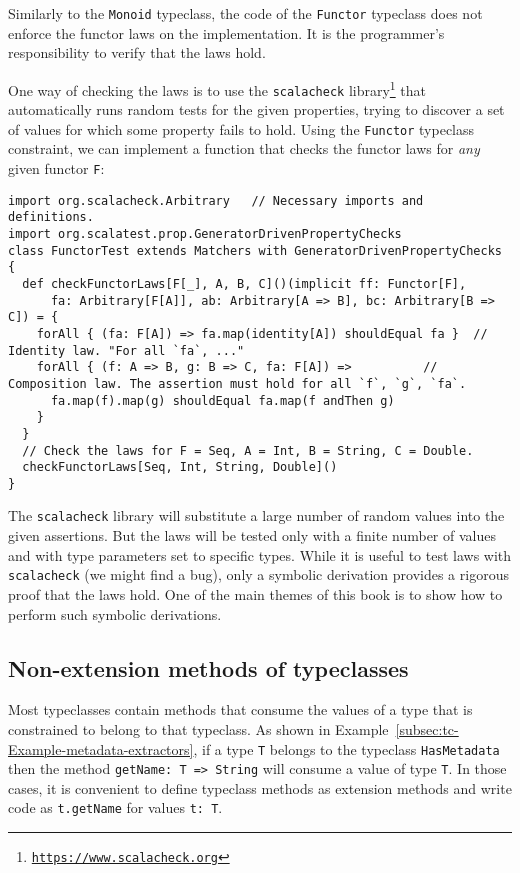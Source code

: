 Similarly to the \lstinline!Monoid! typeclass, the code of the \lstinline!Functor!
typeclass does not enforce the functor laws on the implementation.
It is the programmer\textsf{'}s responsibility to verify that the laws hold.

One way of checking the laws is to use the \texttt{scalacheck} library\footnote{\texttt{\href{https://www.scalacheck.org}{https://www.scalacheck.org}}}
that automatically runs random tests for the given properties, trying
to discover a set of values for which some property fails to hold.
Using the \lstinline!Functor! typeclass constraint, we can implement
a function that checks the functor laws for \emph{any} given functor
\lstinline!F!:
\begin{lstlisting}
import org.scalacheck.Arbitrary   // Necessary imports and definitions.
import org.scalatest.prop.GeneratorDrivenPropertyChecks
class FunctorTest extends Matchers with GeneratorDrivenPropertyChecks {
  def checkFunctorLaws[F[_], A, B, C]()(implicit ff: Functor[F],
      fa: Arbitrary[F[A]], ab: Arbitrary[A => B], bc: Arbitrary[B => C]) = {
    forAll { (fa: F[A]) => fa.map(identity[A]) shouldEqual fa }  // Identity law. "For all `fa`, ..."
    forAll { (f: A => B, g: B => C, fa: F[A]) =>          // Composition law. The assertion must hold for all `f`, `g`, `fa`.
      fa.map(f).map(g) shouldEqual fa.map(f andThen g)
    }
  }
  // Check the laws for F = Seq, A = Int, B = String, C = Double.
  checkFunctorLaws[Seq, Int, String, Double]()
}
\end{lstlisting}

The \texttt{scalacheck} library will substitute a large number of
random values into the given assertions. But the laws will be tested
only with a finite number of values and with type parameters set to
specific types. While it is useful to test laws with \texttt{scalacheck}
(we might find a bug), only a symbolic derivation provides a rigorous
proof that the laws hold. One of the main themes of this book is to
show how to perform such symbolic derivations.

\subsection{Non-extension methods of typeclasses}

Most typeclasses contain methods that consume the values of a type
that is constrained to belong to that typeclass. As shown in Example~\ref{subsec:tc-Example-metadata-extractors},
if a type \lstinline!T! belongs to the typeclass \lstinline!HasMetadata!
then the method \lstinline!getName: T => String! will consume a value
of type \lstinline!T!. In those cases, it is convenient to define
typeclass methods as extension methods and write code as \lstinline!t.getName!
for values \lstinline!t: T!.

